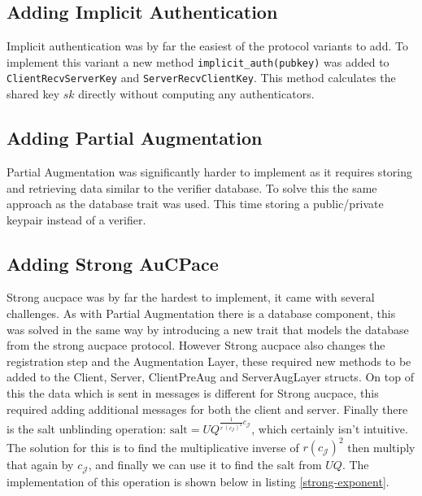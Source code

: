 \subsection{Adding Implicit Authentication}
Implicit authentication was by far the easiest of the protocol variants to add.
To implement this variant a new method \texttt{implicit\_auth(pubkey)} was added to \texttt{ClientRecvServerKey} and \texttt{ServerRecvClientKey}.
This method calculates the shared key $sk$ directly without computing any authenticators.

\subsection{Adding Partial Augmentation}
Partial Augmentation was significantly harder to implement as it requires storing and retrieving data similar to the verifier database.
To solve this the same approach as the database trait was used.
This time storing a public/private keypair instead of a verifier.

\subsection{Adding Strong AuCPace}
Strong \gls{aucpace} was by far the hardest to implement, it came with several challenges.
As with Partial Augmentation there is a database component, this was solved in the same way by introducing a new trait that models the database from the strong \gls{aucpace} protocol.
However Strong \gls{aucpace} also changes the registration step and the Augmentation Layer, these required new methods to be added to the Client, Server, ClientPreAug and ServerAugLayer structs.
On top of this the data which is sent in messages is different for Strong \gls{aucpace}, this required adding additional messages for both the client and server.
Finally there is the salt unblinding operation: $\text{salt} = UQ^{\frac{1}{r\ (c_{\mathcal{J}})^2} c_{\mathcal{J}}}$, which certainly isn't intuitive.
The solution for this is to find the multiplicative inverse of $r (c_{\mathcal{J}})^2$ then multiply that again by $c_{\mathcal{J}}$, and finally we can use it to find the salt from $UQ$.
The implementation of this operation is shown below in listing \ref{strong-exponent}.


